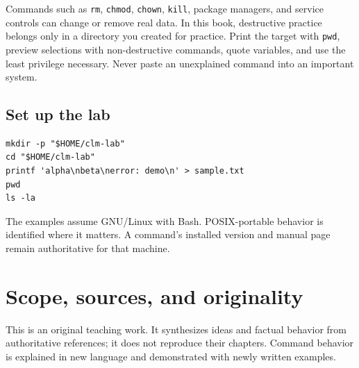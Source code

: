 \documentclass[11pt,oneside,openany]{book}
\begin{document}
\begin{warningbox}[title={The safe-lab rule}]
Commands such as \texttt{rm}, \texttt{chmod}, \texttt{chown}, \texttt{kill}, package managers, and service controls can change or remove real data. In this book, destructive practice belongs only in a directory you created for practice. Print the target with \texttt{pwd}, preview selections with non-destructive commands, quote variables, and use the least privilege necessary. Never paste an unexplained command into an important system.
\end{warningbox}

\section*{Set up the lab}
\begin{lstlisting}
mkdir -p "$HOME/clm-lab"
cd "$HOME/clm-lab"
printf 'alpha\nbeta\nerror: demo\n' > sample.txt
pwd
ls -la
\end{lstlisting}

The examples assume GNU/Linux with Bash. POSIX-portable behavior is identified where it matters. A command's installed version and manual page remain authoritative for that machine.

\chapter*{Scope, sources, and originality}
This is an original teaching work. It synthesizes ideas and factual behavior from authoritative references; it does not reproduce their chapters. Command behavior is explained in new language and demonstrated with newly written examples.
\end{document}
